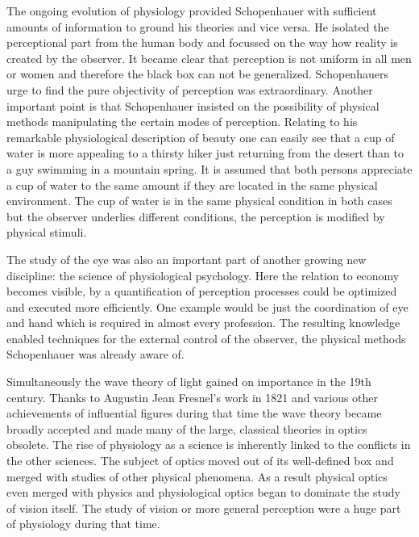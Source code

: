 \documentclass[12pt,a4paper]{article}
\begin{document}
The ongoing evolution of physiology provided Schopenhauer with sufficient amounts of information to
ground his theories and vice versa. He isolated the perceptional part from the human body and
focussed on the way how reality is created by the observer. It became clear that perception is not
uniform in all men or women and therefore the black box can not be generalized. Schopenhauers urge to
find the pure objectivity of perception was extraordinary. Another important point is that
Schopenhauer insisted on the possibility of physical methods manipulating the certain modes of
perception. Relating to his remarkable physiological description of beauty one can easily see that
a cup of water is more appealing to a thirsty hiker just returning from the desert than to a
guy swimming in a mountain spring. It is assumed that both persons appreciate a cup of water to
the same amount if they are located in the same physical environment.
The cup of water is in the same physical condition in both cases but the observer underlies different
conditions, the perception is modified by physical stimuli.

The study of the eye was also an important part of another growing new discipline: the science of
physiological psychology. Here the relation to economy becomes visible, by a quantification of
perception processes could be optimized and executed more efficiently. One example would be just the
coordination of eye and hand which is required in almost every profession. The resulting
knowledge enabled techniques for the external control of the observer, the physical methods
Schopenhauer was already aware of.

Simultaneously the wave theory of light gained on importance in the 19th century.
Thanks to Augustin Jean Fresnel's work in 1821 and various other achievements of influential figures 
during that time the wave theory became broadly accepted and made many of the large,
classical theories in optics obsolete. The rise of physiology as a science is inherently linked
to the conflicts in the other sciences. The subject of optics moved out of its well-defined box
and merged with studies of other physical phenomena.
As a result physical optics even merged with physics and physiological optics began to dominate
the study of vision itself. The study of vision or more general perception were a huge part of physiology
during that time.
\end{document}
